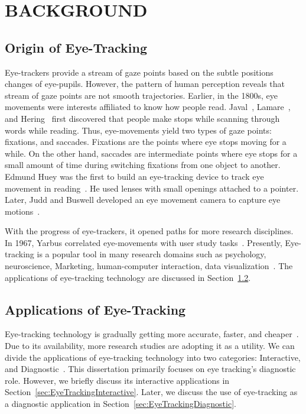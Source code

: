 \chapter{BACKGROUND}
\label{chap:Foundations}
\section{Origin of Eye-Tracking}
Eye-trackers provide a stream of gaze points based on the subtle positions changes of eye-pupils. However, the pattern of human perception reveals that stream of gaze points are not smooth trajectories. Earlier, in the 1800s, eye movements were interests affiliated to know how people read.  Javal~\cite{javal1878essai}, Lamare~\cite{lamare1893mouvements}, and  Hering~\cite{hering1879raumsinn} first discovered that people make stops while scanning through words while reading. Thus, eye-movements yield two types of gaze points: fixations, and saccades. Fixations are the points where eye stops moving for a while. On the other hand, saccades are intermediate points where eye stops for a small amount of time during switching fixations from one object to another. Edmund Huey was the first to build an eye-tracking device to track eye movement in reading~\cite{huey1908psychology}. He used lenses with small openings attached to a pointer. Later, Judd and Buswell developed an eye movement camera to capture eye motions~\cite{judd1922silent}. 

With the progress of eye-trackers, it opened paths for more research disciplines. In 1967, Yarbus correlated eye-movements with user study tasks~\cite{yarbus1967eye}. Presently, Eye-tracking is a popular tool in many research domains such as psychology, neuroscience, Marketing, human-computer interaction, data visualization~\cite{Duch02}. The applications of eye-tracking technology are discussed in Section~\ref{sec:EyeTrackingApplication}.



\section{Applications of Eye-Tracking}
\label{sec:EyeTrackingApplication}
Eye-tracking technology is gradually getting more accurate, faster, and cheaper~\cite{Duch07}. Due to its availability, more research studies are adopting it as a utility. We can divide the applications of eye-tracking technology into two categories: Interactive, and Diagnostic~\cite{Duch02}. This dissertation primarily focuses on eye tracking's diagnostic role. However, we briefly discuss its interactive applications in Section~\ref{sec:EyeTrackingInteractive}. Later, we discuss the use of eye-tracking as a diagnostic application in Section~\ref{sec:EyeTrackingDiagnostic}. 

